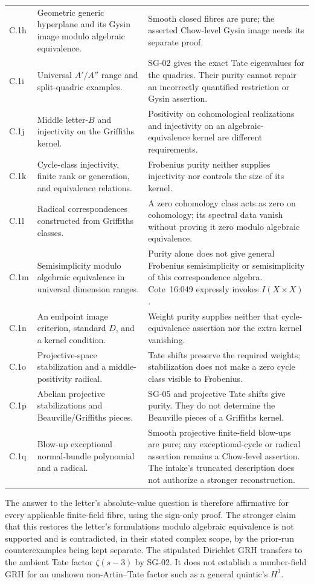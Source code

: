 \documentclass[11pt,a4paper]{article}
\theoremstyle{remark}
\begin{document}
{\begin{longtable}{@{}p{}p{}p{}@{}}
C.1h & Geometric generic hyperplane and its Gysin image modulo algebraic equivalence. & Smooth closed fibres are pure; the asserted Chow-level Gysin image needs its separate proof. \\
C.1i & Universal $A'/A''$ range and split-quadric examples. & SG-02 gives the exact Tate eigenvalues for the quadrics. Their purity cannot repair an incorrectly quantified restriction or Gysin assertion. \\
C.1j & Middle letter-$B$ and injectivity on the Griffiths kernel. & Positivity on cohomological realizations and injectivity on an algebraic-equivalence kernel are different requirements. \\
C.1k & Cycle-class injectivity, finite rank or generation, and equivalence relations. & Frobenius purity neither supplies injectivity nor controls the size of its kernel. \\
C.1l & Radical correspondences constructed from Griffiths classes. & A zero cohomology class acts as zero on cohomology; its spectral data vanish without proving it zero modulo algebraic equivalence. \\
C.1m & Semisimplicity modulo algebraic equivalence in universal dimension ranges. & Purity alone does not give general Frobenius semisimplicity or semisimplicity of this correspondence algebra. Cote~16:049 expressly invokes $I(X\times X)$. \\
C.1n & An endpoint image criterion, standard $D$, and a kernel condition. & Weight purity supplies neither that cycle-equivalence assertion nor the extra kernel vanishing. \\
C.1o & Projective-space stabilization and a middle-positivity radical. & Tate shifts preserve the required weights; stabilization does not make a zero cycle class visible to Frobenius. \\
C.1p & Abelian projective stabilizations and Beauville/Griffiths pieces. & SG-05 and projective Tate shifts give purity. They do not determine the Beauville pieces of a Griffiths kernel. \\
C.1q & Blow-up exceptional normal-bundle polynomial and a radical. & Smooth projective finite-field blow-ups are pure; any exceptional-cycle or radical assertion remains a Chow-level assertion. The intake's truncated description does not authorize a stronger reconstruction. \\
\bottomrule
\end{longtable}
}

The answer to the letter's absolute-value question is therefore affirmative for every applicable finite-field fibre, using the sign-only proof. The stronger claim that this restores the letter's formulations modulo algebraic equivalence is not supported and is contradicted, in their stated complex scope, by the prior-run counterexamples being kept separate. The stipulated Dirichlet GRH transfers to the ambient Tate factor $\zeta(s-3)$ by SG-02. It does not establish a number-field GRH for an unshown non-Artin--Tate factor such as a general quintic's $H^3$.
\end{document}
